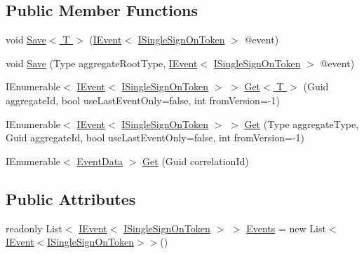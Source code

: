 \subsection*{Public Member Functions}
\begin{DoxyCompactItemize}
\item 
void \hyperlink{classCqrs_1_1Tests_1_1Substitutes_1_1TestInMemoryEventStore_ac5d70085f30ac4c8be0790bc14de90d3_ac5d70085f30ac4c8be0790bc14de90d3}{Save$<$ T $>$} (\hyperlink{interfaceCqrs_1_1Events_1_1IEvent}{I\+Event}$<$ \hyperlink{interfaceCqrs_1_1Authentication_1_1ISingleSignOnToken}{I\+Single\+Sign\+On\+Token} $>$ @event)
\item 
void \hyperlink{classCqrs_1_1Tests_1_1Substitutes_1_1TestInMemoryEventStore_ad55933a4b148cef3d59c5552038af878_ad55933a4b148cef3d59c5552038af878}{Save} (Type aggregate\+Root\+Type, \hyperlink{interfaceCqrs_1_1Events_1_1IEvent}{I\+Event}$<$ \hyperlink{interfaceCqrs_1_1Authentication_1_1ISingleSignOnToken}{I\+Single\+Sign\+On\+Token} $>$ @event)
\item 
I\+Enumerable$<$ \hyperlink{interfaceCqrs_1_1Events_1_1IEvent}{I\+Event}$<$ \hyperlink{interfaceCqrs_1_1Authentication_1_1ISingleSignOnToken}{I\+Single\+Sign\+On\+Token} $>$ $>$ \hyperlink{classCqrs_1_1Tests_1_1Substitutes_1_1TestInMemoryEventStore_a6fe1ca9d8bcd3f29401457340139af11_a6fe1ca9d8bcd3f29401457340139af11}{Get$<$ T $>$} (Guid aggregate\+Id, bool use\+Last\+Event\+Only=false, int from\+Version=-\/1)
\item 
I\+Enumerable$<$ \hyperlink{interfaceCqrs_1_1Events_1_1IEvent}{I\+Event}$<$ \hyperlink{interfaceCqrs_1_1Authentication_1_1ISingleSignOnToken}{I\+Single\+Sign\+On\+Token} $>$ $>$ \hyperlink{classCqrs_1_1Tests_1_1Substitutes_1_1TestInMemoryEventStore_a45873558fbc3bc5eb1766ffc6fbead88_a45873558fbc3bc5eb1766ffc6fbead88}{Get} (Type aggregate\+Type, Guid aggregate\+Id, bool use\+Last\+Event\+Only=false, int from\+Version=-\/1)
\item 
I\+Enumerable$<$ \hyperlink{classCqrs_1_1Events_1_1EventData}{Event\+Data} $>$ \hyperlink{classCqrs_1_1Tests_1_1Substitutes_1_1TestInMemoryEventStore_a23098904b073af45d3a945f4a21d51e3_a23098904b073af45d3a945f4a21d51e3}{Get} (Guid correlation\+Id)
\end{DoxyCompactItemize}
\subsection*{Public Attributes}
\begin{DoxyCompactItemize}
\item 
readonly List$<$ \hyperlink{interfaceCqrs_1_1Events_1_1IEvent}{I\+Event}$<$ \hyperlink{interfaceCqrs_1_1Authentication_1_1ISingleSignOnToken}{I\+Single\+Sign\+On\+Token} $>$ $>$ \hyperlink{classCqrs_1_1Tests_1_1Substitutes_1_1TestInMemoryEventStore_add97988e933c2316c445bf4611c2d0ba_add97988e933c2316c445bf4611c2d0ba}{Events} = new List$<$\hyperlink{interfaceCqrs_1_1Events_1_1IEvent}{I\+Event}$<$\hyperlink{interfaceCqrs_1_1Authentication_1_1ISingleSignOnToken}{I\+Single\+Sign\+On\+Token}$>$$>$()
\end{DoxyCompactItemize}


